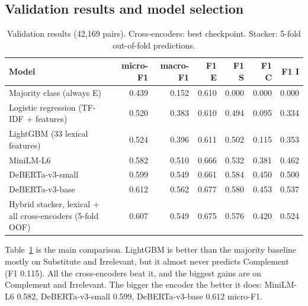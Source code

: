\documentclass[11pt]{article}
\begin{document}
\subsection{Validation results and model selection}
\begin{table}[H]\centering\small
\begin{tabular}{lrrrrrr}\toprule
Model & micro-F1 & macro-F1 & F1 E & F1 S & F1 C & F1 I \\\midrule
Majority class (always E) & 0.439 & 0.152 & 0.610 & 0.000 & 0.000 & 0.000 \\
Logistic regression (TF-IDF + features) & 0.520 & 0.383 & 0.610 & 0.494 & 0.095 & 0.334 \\
LightGBM (33 lexical features) & 0.524 & 0.396 & 0.611 & 0.502 & 0.115 & 0.353 \\
MiniLM-L6 & 0.582 & 0.510 & 0.666 & 0.532 & 0.381 & 0.462 \\
DeBERTa-v3-small & 0.599 & 0.549 & 0.661 & 0.584 & 0.450 & 0.500 \\
DeBERTa-v3-base & 0.612 & 0.562 & 0.677 & 0.580 & 0.453 & 0.537 \\
Hybrid stacker, lexical + all cross-encoders (5-fold OOF) & 0.607 & 0.549 & 0.675 & 0.576 & 0.420 & 0.524 \\
\bottomrule\end{tabular}
\caption{Validation results (42{,}169 pairs). Cross-encoders: best checkpoint. Stacker: 5-fold out-of-fold predictions.}\label{tab:val}
\end{table}

Table~\ref{tab:val} is the main comparison. LightGBM is better than the majority baseline mostly on Substitute and Irrelevant, but it almost never predicts Complement (F1 0.115).
All the cross-encoders beat it, and the biggest gains are on Complement and Irrelevant. The bigger the encoder the better it does: MiniLM-L6 0.582, DeBERTa-v3-small 0.599, DeBERTa-v3-base 0.612 micro-F1.
\end{document}
